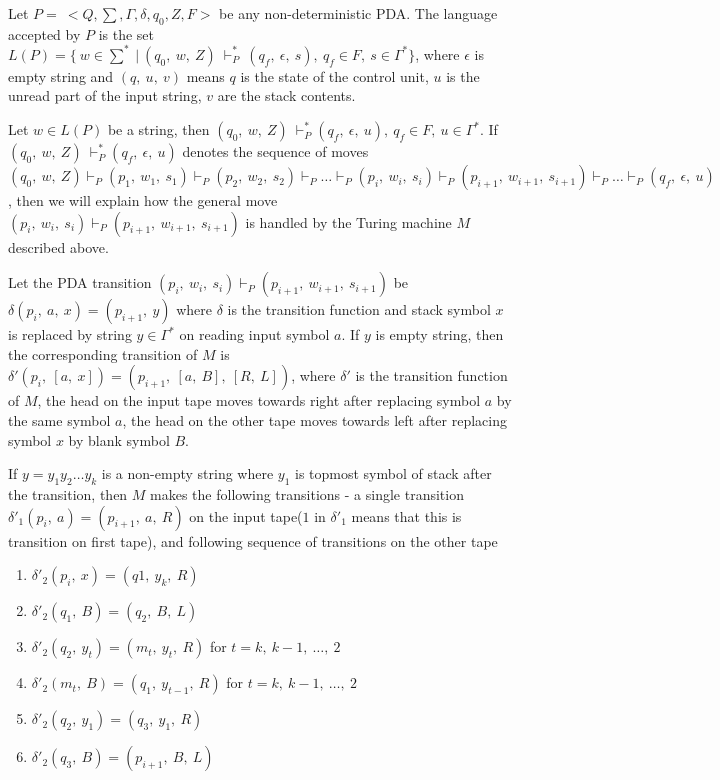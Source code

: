 \documentclass{article}
\begin{document}
    Let $P=~<Q, \sum, \Gamma, \delta, q_0, Z, F>$ be any non-deterministic PDA. The language accepted by $P$ is the set $L(P)=\{~w \in \sum^*~|~(q_0,~w,~Z)\ {\vdash}^*_P ~(q_f,~\epsilon,~s), ~q_f \in F,~s \in \Gamma^* \}$, where $\epsilon$ is empty string and $(q,~u,~v)$ means $q$ is the state of the control unit, $u$ is the unread part of the input string, $v$ are the stack contents. 
    
    Let $w \in L(P)$ be a string, then $(q_0,~w,~Z)\ {\vdash}^*_P(q_f,~\epsilon,~u), ~q_f \in F,~u \in \Gamma^*$. If $(q_0,~w,~Z)\ {\vdash}^*_P(q_f,~\epsilon,~u)$ denotes the sequence of moves $(q_0,~w,~Z) \vdash_P(p_1,~w_1,~s_1) \vdash_P(p_2,~w_2,~s_2)\vdash_P \ldots \vdash_P (p_i,~w_i,~s_i) \vdash_P(p_{i+1},~w_{i+1},~s_{i+1}) \vdash_P \ldots \vdash_P(q_f,~\epsilon,~u)$, then we will explain how the general move $(p_i,~w_i,~s_i) \vdash_P(p_{i+1},~w_{i+1},~s_{i+1})$ is handled by the Turing machine $M$ described above.
    
    Let the PDA transition $(p_i,~w_i,~s_i) \vdash_P(p_{i+1},~w_{i+1},~s_{i+1})$ be $\delta(p_i,~a,~x)=(p_{i+1},~y)$ where $\delta$ is the transition function and stack symbol $x$ is replaced by string $y \in \Gamma^*$ on reading input symbol $a$.
    If $y$ is empty string, then the corresponding transition of $M$ is $\delta'(p_i,~[a,~x])=(p_{i+1},~[a,~B],~[R,~L])$, where $\delta'$ is the transition function of $M$, the head on the input tape moves towards right after replacing symbol $a$ by the same symbol $a$, the head on the other tape moves towards left after replacing symbol $x$ by blank symbol $B$.
    
    If $y=y_1y_2\ldots y_k$ is a non-empty string where $y_1$ is topmost symbol of stack after the transition, then $M$ makes the following transitions - a single transition $\delta'_1(p_i,~a)=(p_{i+1},~a,~R)$ on the input tape($1$ in $\delta'_1$ means that this is transition on first tape), and following sequence of transitions on the other tape
    \begin{enumerate}
        \item $\delta'_2(p_i,~x)=(q1,~y_k,~R)$
        \item $\delta'_2(q_1,~B)=(q_2,~B,~L)$
        \item $\delta'_2(q_2,~y_t)=(m_t,~y_t,~R)$ for $t=k,~k-1,~\ldots,~2$
        \item $\delta'_2(m_t,~B)=(q_1,~y_{t-1},~R)$ for $t=k,~k-1,~\ldots,~2$
        \item $\delta'_2(q_2,~y_1)=(q_3,~y_1,~R)$
        \item $\delta'_2(q_3,~B)=(p_{i+1},~B,~L)$
    \end{enumerate}
    
\end{document}
